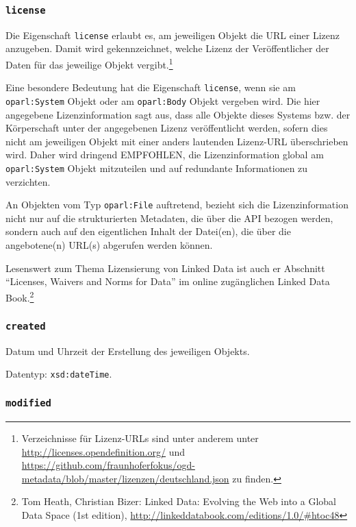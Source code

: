 \documentclass[,a4paper]{article}
\begin{document}
\subsubsection{\texttt{license}}\label{license}

Die Eigenschaft \texttt{license} erlaubt es, am jeweiligen Objekt die
URL einer Lizenz anzugeben. Damit wird gekennzeichnet, welche Lizenz der
Veröffentlicher der Daten für das jeweilige Objekt vergibt.\footnote{Verzeichnisse
  für Lizenz-URLs sind unter anderem unter
  \url{http://licenses.opendefinition.org/} und
  \url{https://github.com/fraunhoferfokus/ogd-metadata/blob/master/lizenzen/deutschland.json}
  zu finden.}

Eine besondere Bedeutung hat die Eigenschaft \texttt{license}, wenn sie
am \texttt{oparl:System} Objekt oder am \texttt{oparl:Body} Objekt
vergeben wird. Die hier angegebene Lizenzinformation sagt aus, dass alle
Objekte dieses Systems bzw. der Körperschaft unter der angegebenen
Lizenz veröffentlicht werden, sofern dies nicht am jeweiligen Objekt mit
einer anders lautenden Lizenz-URL überschrieben wird. Daher wird
dringend EMPFOHLEN, die Lizenzinformation global am
\texttt{oparl:System} Objekt mitzuteilen und auf redundante
Informationen zu verzichten.

An Objekten vom Typ \texttt{oparl:File} auftretend, bezieht sich die
Lizenzinformation nicht nur auf die strukturierten Metadaten, die über
die API bezogen werden, sondern auch auf den eigentlichen Inhalt der
Datei(en), die über die angebotene(n) URL(s) abgerufen werden können.

Lesenswert zum Thema Lizensierung von Linked Data ist auch er Abschnitt
``Licenses, Waivers and Norms for Data'' im online zugänglichen Linked
Data Book.\footnote{Tom Heath, Christian Bizer: Linked Data: Evolving
  the Web into a Global Data Space (1st edition),
  \url{http://linkeddatabook.com/editions/1.0/\#htoc48}}

\subsubsection{\texttt{created}}\label{created}

Datum und Uhrzeit der Erstellung des jeweiligen Objekts.

Datentyp: \texttt{xsd:dateTime}.

\subsubsection{\texttt{modified}}\label{modified}
\end{document}
